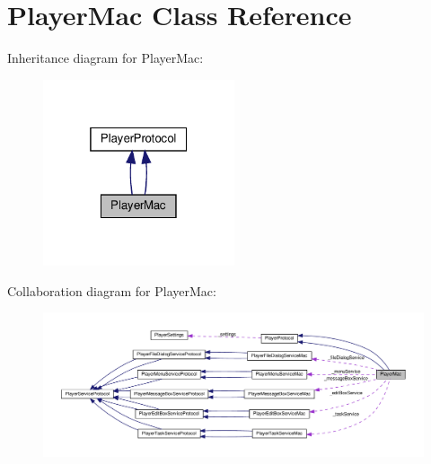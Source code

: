 \hypertarget{classPlayerMac}{}\section{Player\+Mac Class Reference}
\label{classPlayerMac}


Inheritance diagram for Player\+Mac\+:
\nopagebreak
\begin{figure}[H]
\begin{center}
\leavevmode
\includegraphics[width=160pt]{classPlayerMac__inherit__graph}
\end{center}
\end{figure}


Collaboration diagram for Player\+Mac\+:
\nopagebreak
\begin{figure}[H]
\begin{center}
\leavevmode
\includegraphics[width=350pt]{classPlayerMac__coll__graph}
\end{center}
\end{figure}
